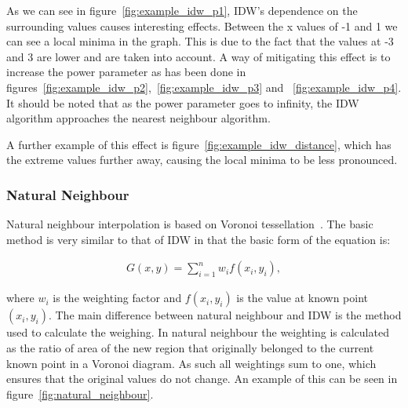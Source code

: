             As we can see in figure~\ref{fig:example_idw_p1}, IDW's dependence on the surrounding values causes interesting effects. Between the x values of -1 and 1 we can see a local minima in the graph. This is due to the fact that the values at -3 and 3 are lower and are taken into account. A way of mitigating this effect is to increase the power parameter as has been done in figures~\ref{fig:example_idw_p2},~\ref{fig:example_idw_p3} and ~\ref{fig:example_idw_p4}. It should be noted that as the power parameter goes to infinity, the IDW algorithm approaches the nearest neighbour algorithm. 

            A further example of this effect is figure~\ref{fig:example_idw_distance}, which has the extreme values further away, causing the local minima to be less pronounced.



        \subsubsection{Natural Neighbour}\label{background_interpolation_methods_natural_neighbour}

            Natural neighbour interpolation is based on Voronoi tessellation~\cite{multivariatedata}. The basic method is very similar to that of IDW in that the basic form of the equation is:

            \begin{align*}
                G(x,y) = \sum_{i=1}^{n}{w_{i}f(x_{i},y_{i})}, 
            \end{align*}

            where $w_{i}$ is the weighting factor and $f(x_{i},y_{i})$ is the value at known point $(x_{i},y_{i})$. The main difference between natural neighbour and IDW is the method used to calculate the weighing. In natural neighbour the weighting is calculated as the ratio of area of the new region that originally belonged to the current known point in a Voronoi diagram. As such all weightings sum to one, which ensures that the original values do not change. An example of this can be seen in figure~\ref{fig:natural_neighbour}. 


